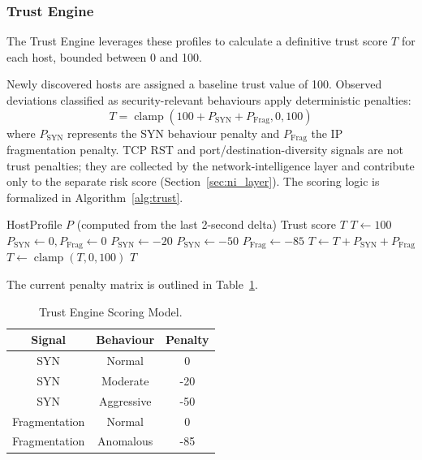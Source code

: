 \documentclass[conference]{IEEEtran}
\begin{document}
\subsubsection{Trust Engine}
The Trust Engine leverages these profiles to calculate a definitive trust score $T$ for each host, bounded between 0 and 100. 

Newly discovered hosts are assigned a baseline trust value of 100. Observed deviations classified as security-relevant behaviours apply deterministic penalties:
\begin{equation}
T = \operatorname{clamp}\left(100 + P_{\text{SYN}} + P_{\text{Frag}}, 0, 100\right)
\end{equation}
where $P_{\text{SYN}}$ represents the SYN behaviour penalty and $P_{\text{Frag}}$ the IP fragmentation penalty. TCP RST and port/destination-diversity signals are not trust penalties; they are collected by the network-intelligence layer and contribute only to the separate risk score (Section~\ref{sec:ni_layer}). The scoring logic is formalized in Algorithm~\ref{alg:trust}.

\begin{algorithm}[h]
\caption{ADG Host Trust Computation}
\label{alg:trust}
\begin{algorithmic}[1]
\REQUIRE HostProfile $P$ (computed from the last 2-second delta)
\ENSURE Trust score $T$
\STATE $T \leftarrow 100$
\STATE $P_{\text{SYN}} \leftarrow 0, P_{\text{Frag}} \leftarrow 0$
    \STATE $P_{\text{SYN}} \leftarrow -20$
    \STATE $P_{\text{SYN}} \leftarrow -50$
\ENDIF
{}
    \STATE $P_{\text{Frag}} \leftarrow -85$
\ENDIF
\STATE $T \leftarrow T + P_{\text{SYN}} + P_{\text{Frag}}$
\STATE $T \leftarrow \operatorname{clamp}(T, 0, 100)$
\RETURN $T$
\end{algorithmic}
\end{algorithm}

The current penalty matrix is outlined in Table~\ref{tab:scoring}.

\begin{table}[h]
\centering
\caption{Trust Engine Scoring Model.}
\label{tab:scoring}
\begin{tabular}{ccc}
\toprule
Signal & Behaviour & Penalty \\
\midrule
SYN & Normal & 0 \\
SYN & Moderate & -20 \\
SYN & Aggressive & -50 \\
Fragmentation & Normal & 0 \\
Fragmentation & Anomalous & -85 \\
\bottomrule
\end{tabular}
\end{table}
\end{document}
